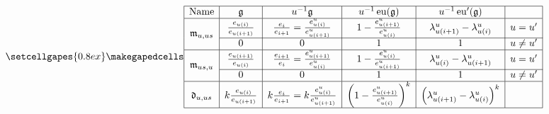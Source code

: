 \documentclass[border={7pt 0pt 22pt 0pt},varwidth]{standalone}
\DeclareMathOperator{\eu}{\operatorname{eu}}
\begin{document}
\begin{table}[ht]
 \[
 \setcellgapes{0.8ex}\makegapedcells
\centering
 \begin{array}{|c|c|c|c|c|c|}
\hline
\text{Name}         & \mathfrak{g}                 & u^{-1}\mathfrak{g}                                           & u^{-1}\eu(\mathfrak{g})                                & u^{-1}\eu'(\mathfrak{g})                                 &           \\ \hline
\multirow{2}{*}{$\mathfrak{m}_{u,us}$} & \frac{e_{u(i)}}{e_{u(i+1)}}  & \frac{e_{i}}{e_{i+1}}= \frac{e_{u(i)}^{u}}{e_{u(i+1)}^{u}}   & 1-\frac{e_{u(i+1)}^{u}}{e_{u(i)}^{u}}                  & \lambda_{u(i+1)}^{u}-\lambda_{u(i)}^{u}                  & u=u'      \\ \cline{2-6}
                    & 0                            & 0                                                            & 1                                                      & 1                                                        & u \neq u' \\ \hline
\multirow{2}{*}{$\mathfrak{m}_{us,u}$} & \frac{e_{u(i+1)}}{e_{u(i)}}  & \frac{e_{i+1}}{e_{i}}= \frac{e_{u(i+1)}^{u}}{e_{u(i)}^{u}}   & 1-\frac{e_{u(i)}^{u}}{e_{u(i+1)}^{u}}                  & \lambda_{u(i)}^{u}-\lambda_{u(i+1)}^{u}                  & u=u'      \\ \cline{2-6}
                    & 0                            & 0                                                            & 1                                                      & 1                                                        & u \neq u' \\ \hline
\mathfrak{d}_{u,us} & k\frac{e_{u(i)}}{e_{u(i+1)}} & k\frac{e_{i}}{e_{i+1}}= k\frac{e_{u(i)}^{u}}{e_{u(i+1)}^{u}} & \left(1-\frac{e_{u(i+1)}^{u}}{e_{u(i)}^{u}}\right)^{k} & \left(\lambda_{u(i+1)}^{u}-\lambda_{u(i)}^{u}\right)^{k} &           \\ \hline
 \end{array}
 \]
        
\end{table}
\end{document}
